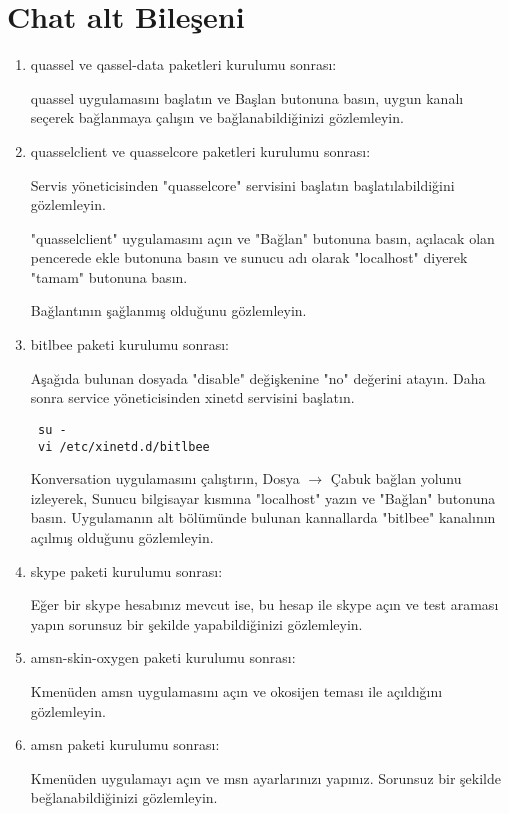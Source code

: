 \documentclass[a4paper,10pt]{article}
\begin{document}
\section{Chat alt Bileşeni}
\begin{enumerate}

\item quassel ve qassel-data paketleri kurulumu sonrası:

quassel uygulamasını başlatın ve Başlan butonuna basın, uygun kanalı seçerek bağlanmaya çalışın ve bağlanabildiğinizi gözlemleyin.

\item quasselclient ve quasselcore paketleri kurulumu sonrası:

Servis yöneticisinden "quasselcore" servisini başlatın başlatılabildiğini gözlemleyin.

"quasselclient" uygulamasını açın ve "Bağlan" butonuna basın, açılacak olan pencerede ekle butonuna basın ve sunucu adı olarak "localhost" diyerek "tamam" butonuna basın.

Bağlantının şağlanmış olduğunu gözlemleyin.

\item bitlbee paketi kurulumu sonrası:

Aşağıda bulunan dosyada "disable" değişkenine "no" değerini atayın. Daha sonra service yöneticisinden xinetd servisini başlatın. 
\begin{verbatim}
 su -
 vi /etc/xinetd.d/bitlbee
\end{verbatim}

Konversation uygulamasını çalıştırın, Dosya $\rightarrow$ Çabuk bağlan yolunu izleyerek, Sunucu bilgisayar kısmına "localhost" yazın ve "Bağlan" butonuna basın. Uygulamanın alt bölümünde bulunan kannallarda "bitlbee" kanalının açılmış olduğunu gözlemleyin.

\item skype paketi kurulumu sonrası:

Eğer bir skype hesabınız mevcut ise, bu hesap ile skype açın ve test araması yapın sorunsuz bir şekilde yapabildiğinizi gözlemleyin.
\item amsn-skin-oxygen paketi kurulumu sonrası:

Kmenüden amsn uygulamasını açın ve okosijen teması ile açıldığını gözlemleyin.

\item amsn paketi kurulumu sonrası:

Kmenüden uygulamayı açın ve msn ayarlarınızı yapınız. Sorunsuz bir şekilde beğlanabildiğinizi gözlemleyin.


\end{enumerate}
\end{document}
